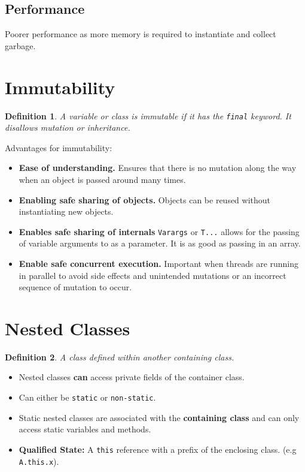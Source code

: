 \documentclass[10pt,landscape,a4paper]{article}
\newtheorem{definition}{Definition}[section]
\begin{document}
\begin{multicols*}{4}
\subsection{Performance}
Poorer performance as more memory is required to instantiate and collect garbage.


\section{Immutability}
\begin{definition}
    A variable or class is immutable if it has the \texttt{final} keyword. It disallows mutation or inheritance.
\end{definition}
Advantages for immutability:
\begin{itemize}
    \item \textbf{Ease of understanding.}
        \subitem Ensures that there is no mutation along the way when an object is passed around many times.
    \item \textbf{Enabling safe sharing of objects.}
        \subitem Objects can be reused without instantiating new objects.
    \item \textbf{Enables safe sharing of internals}
        \subitem \texttt{Varargs} or \texttt{T...} allows for the passing of variable arguments to as a parameter. It is as good as passing in an array. 
    \item \textbf{Enable safe concurrent execution.}
        \subitem Important when threads are running in parallel to avoid side effects and unintended mutations or an incorrect sequence of mutation to occur.
\end{itemize}
\section{Nested Classes}
\begin{definition}
    A class defined within another containing class.
\end{definition}
\begin{itemize}
    \item Nested classes \textbf{can} access private fields of the container class.
    \item Can either be \texttt{static} or \texttt{non-static}.
    \item Static nested classes are associated with the \textbf{containing class} and can only access static variables and methods.
    \item \textbf{Qualified State:} A \texttt{this} reference with a prefix of the enclosing class. (e.g \texttt{A.this.x}). 
\end{itemize}


\end{multicols*}
\end{document}
